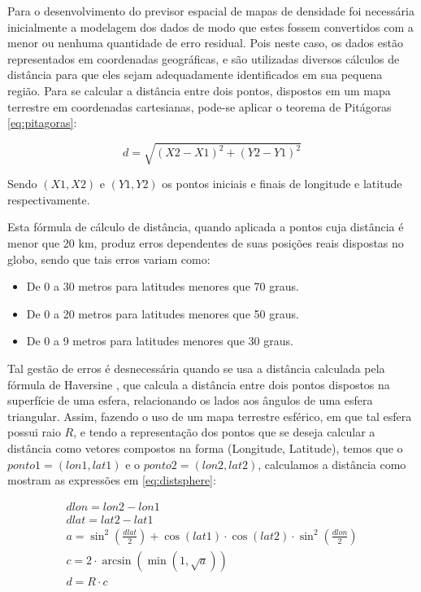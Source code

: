Para o desenvolvimento do previsor espacial de mapas de densidade foi necessária inicialmente a modelagem dos dados de modo que estes fossem convertidos com a menor ou nenhuma quantidade de erro residual. Pois neste caso, os dados estão representados em coordenadas geográficas, e são utilizadas diversos cálculos de distância para que eles sejam adequadamente identificados em sua pequena região. Para se calcular a distância entre dois pontos, dispostos em um mapa terrestre em coordenadas cartesianas, pode-se aplicar o teorema de Pitágoras \ref{eq:pitagoras}:

\begin{equation}
\label{eq:pitagoras}
d = \sqrt{(X2 - X1)^2 + (Y2 - Y1)^2}
\end{equation}

Sendo \((X1, X2)\) e \((Y1,Y2)\) os pontos iniciais e finais de longitude e latitude respectivamente.

Esta fórmula de cálculo de distância, quando aplicada a pontos cuja distância é menor que 20 km, produz erros dependentes de suas posições reais dispostas no globo, sendo que tais erros variam como:
\begin{itemize}
\item De 0 a 30 metros para latitudes menores que 70 graus.
\item De 0 a 20 metros para latitudes menores que 50 graus. 
\item De 0 a 9 metros para latitudes menores que 30 graus.
\end{itemize}

Tal gestão de erros é desnecessária quando se usa a distância calculada pela fórmula de Haversine \cite{shumaker1984astronomical}, que calcula a distância entre dois pontos dispostos na superfície de uma esfera, relacionando os lados aos ângulos de uma esfera triangular. Assim, fazendo o uso de um mapa terrestre esférico, em que tal esfera possui raio \(R\), e tendo a representação dos pontos que se deseja calcular a distância como vetores compostos na forma (Longitude, Latitude), temos que o \(ponto1 = (lon1,lat1)\) e o \(ponto2 = (lon2,lat2)\), calculamos a distância como mostram as expressões em \ref{eq:distsphere}:

\begin{equation}
\label{eq:distsphere}
\begin{split}
dlon = lon2 - lon1 \\
dlat = lat2 - lat1 \\
a = \sin^2\left(\frac{dlat}{2}\right) + \cos(lat1) \cdot \cos(lat2) \cdot \sin^2\left(\frac{dlon}{2}\right) \\
c = 2 \cdot \arcsin(\min(1,\sqrt{a})) \\
d = R \cdot c 
\end{split}
\end{equation}

